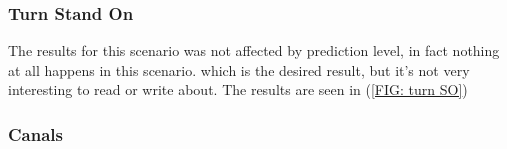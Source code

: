 \subsubsection{Turn Stand On}
The results for this scenario was not affected by prediction level, in fact nothing at all happens in this scenario. which is the desired result,
but it's not very interesting to read or write about. The results are seen in (\ref{FIG: turn SO})


\subsubsection{Canals}
